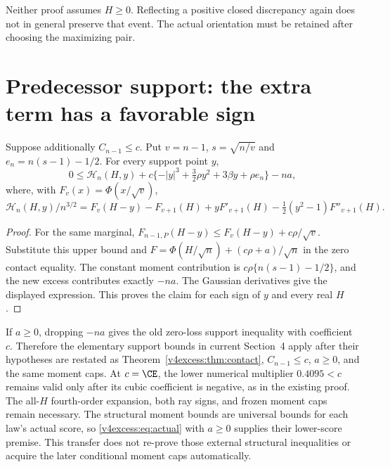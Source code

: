 Neither proof assumes $H\ge0$. Reflecting a positive closed discrepancy
again does not in general preserve that event. The actual orientation
must be retained after choosing the maximizing pair.

\section{Predecessor support: the extra term has a favorable sign}
\begin{theorem}\label{v4excess:thm:support}
Suppose additionally $C_{n-1}\le c$. Put $v=n-1$,
$s=\sqrt{n/v}$ and $e_n=n(s-1)-1/2$. For every support point $y$,
\begin{equation}\label{v4excess:eq:support}
 0\le\mathcal H_n(H,y)
       +c\{-|y|^3+\tfrac32\rho y^2+3\beta y+\rho e_n\}-na,
\end{equation}
where, with $F_v(x)=\Phi(x/\sqrt v)$,
\[
 \mathcal H_n(H,y)/n^{3/2}
 =F_v(H-y)-F_{v+1}(H)+yF'_{v+1}(H)
                    -\tfrac12(y^2-1)F''_{v+1}(H).
\]
\end{theorem}
\begin{proof}
For the same marginal,
$F_{n-1,P}(H-y)\le F_v(H-y)+c\rho/\sqrt v$.
Substitute this upper bound and
$F=\Phi(H/\sqrt n)+(c\rho+a)/\sqrt n$ in the zero contact equality.
The constant moment contribution is
$c\rho\{n(s-1)-1/2\}$, and the new excess contributes exactly $-na$.
The Gaussian derivatives give the displayed expression. This proves the
claim for each sign of $y$ and every real $H$.
\end{proof}

If $a\ge0$, dropping $-na$ gives the old zero-loss support inequality
with coefficient $c$. Therefore the elementary support bounds in current
Section~4 apply after their hypotheses are restated as
Theorem~\ref{v4excess:thm:contact}, $C_{n-1}\le c$, $a\ge0$, and the same moment
caps. At $c=\CE$, the lower numerical multiplier $0.4095<c$ remains
valid only after its cubic coefficient is negative, as in the existing
proof. The all-$H$ fourth-order expansion, both ray signs, and frozen
moment caps remain necessary. The structural moment bounds are universal
bounds for each law's actual score, so \eqref{v4excess:eq:actual} with $a\ge0$
supplies their lower-score premise. This transfer does not re-prove those
external structural inequalities or acquire the later conditional moment
caps automatically.

